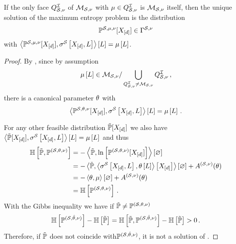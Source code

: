 \begin{theorem} %
    \label{the:maxEntropyInterior}
    If the only face $Q^{\mathcal{I}}_{\mathcal{S},\nu}$ of $\mathcal{M}_{\mathcal{S},\nu}$ with $\mu\in Q^{\mathcal{I}}_{\mathcal{S},\nu}$ is $\mathcal{M}_{\mathcal{S},\nu}$ itself, then the unique solution of the maximum entropy problem  is the distribution
    \begin{align*}
        \mathbb{P}^{\mathcal{S},\mu,\nu}[X_{[d]}]\in\Gamma^{\mathcal{S},\nu}
    \end{align*}
    with $\left\langle \mathbb{P}^{\mathcal{S},\mu,\nu}[X_{[d]}],\sigma^{\mathcal{S}}\left[X_{[d]},L\right]\right\rangle \left[ L \right]=\mu\left[L\right]$.
\end{theorem}
\begin{proof}
    By , since by assumption
    \begin{align*}
        \mu\left[L\right] \in \mathcal{M}_{\mathcal{S},\nu} / \bigcup_{Q^{\mathcal{I}}_{\mathcal{S},\nu}\neq\mathcal{M}_{\mathcal{S},\nu}} Q^{\mathcal{I}}_{\mathcal{S},\nu} \, ,
    \end{align*}
    there is a canonical parameter $\theta$ with
    \begin{align*}
        \left\langle \mathbb{P}^{\mathcal{S},\theta,\nu}[X_{[d]}],\sigma^{\mathcal{S}}\left[X_{[d]},L\right]\right\rangle \left[ L \right]=\mu\left[L\right] \, .
    \end{align*}

    For any other feasible distribution $\tilde{\mathbb{P}}[X_{[d]}]$ we also have $\left\langle \tilde{\mathbb{P}}[X_{[d]}],\sigma^{\mathcal{S}}\left[X_{[d]},L\right]\right\rangle \left[ L \right]=\mu\left[L\right]$ and thus
    \begin{align*}
        \mathbb{H}\left[\tilde{\mathbb{P}},\mathbb{P}^{(\mathcal{S},\theta,\nu)}\right]
        &= -\left\langle \tilde{\mathbb{P}},\ln \left[ \mathbb{P}^{(\mathcal{S},\theta,\nu)}[X_{[d]}] \right]\right\rangle \left[ \varnothing \right] \\
        &= -\left\langle \tilde{\mathbb{P}},\left\langle \sigma^{\mathcal{S}}\left[X_{[d]},L\right],\theta\left[L\right]\right\rangle \left[ X_{[d]} \right]\right\rangle \left[ \varnothing \right] + A^{(\mathcal{S},\nu)}(\theta) \\
        &= - \left\langle \theta,\mu\right\rangle \left[ \varnothing \right] + A^{(\mathcal{S},\nu)}(\theta) \\
        &= \mathbb{H}\left[\mathbb{P}^{(\mathcal{S},\theta,\nu)}\right] \, .
    \end{align*}
    With the Gibbs inequality we have if $\tilde{\mathbb{P}}\neq\mathbb{P}^{(\mathcal{S},\theta,\nu)}$
    \begin{align*}
        \mathbb{H}\left[\mathbb{P}^{(\mathcal{S},\hat{\theta},\nu)}\right] - \mathbb{H}\left[\tilde{\mathbb{P}}\right]
        = \mathbb{H}\left[\tilde{\mathbb{P}},\mathbb{P}^{(\mathcal{S},\hat{\theta},\nu)}\right] - \mathbb{H}\left[\tilde{\mathbb{P}}\right] > 0 \, .
    \end{align*}
    Therefore, if $\tilde{\mathbb{P}}$ does not coincide with$\mathbb{P}^{(\mathcal{S},\hat{\theta},\nu)}$, it is not a solution of .
\end{proof}


